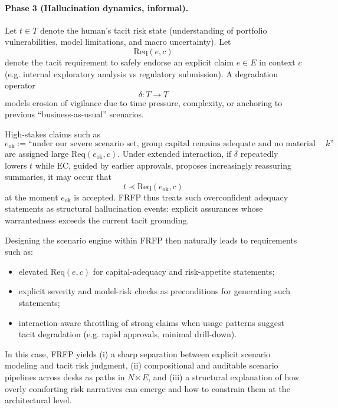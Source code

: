 \paragraph{Phase 3 (Hallucination dynamics, informal).}
Let \(t \in T\) denote the human's tacit risk state (understanding of portfolio vulnerabilities, model limitations, and macro uncertainty). Let
\[
  \mathrm{Req}(e,c)
\]
denote the tacit requirement to safely endorse an explicit claim \(e \in E\) in context \(c\) (e.g. internal exploratory analysis vs regulatory submission). A degradation operator
\[
  \delta: T \to T
\]
models erosion of vigilance due to time pressure, complexity, or anchoring to previous ``business-as-usual'' scenarios.

High-stakes claims such as
\[
  e_{\mathrm{ok}} := \text{``under our severe scenario set, group capital remains adequate and no material vulnerabilities arise in sector \(k\)''}
\]
are assigned large \(\mathrm{Req}(e_{\mathrm{ok}},c)\). Under extended interaction, if \(\delta\) repeatedly lowers \(t\) while \(\mathrm{EC}\), guided by earlier approvals, proposes increasingly reassuring summaries, it may occur that
\[
  t \prec \mathrm{Req}(e_{\mathrm{ok}},c)
\]
at the moment \(e_{\mathrm{ok}}\) is accepted. FRFP thus treats such overconfident adequacy statements as structural hallucination events: explicit assurances whose warrantedness exceeds the current tacit grounding.

Designing the scenario engine within FRFP then naturally leads to requirements such as:
\begin{itemize}
  \item elevated \(\mathrm{Req}(e,c)\) for capital-adequacy and risk-appetite statements;
  \item explicit severity and model-risk checks as preconditions for generating such statements;
  \item interaction-aware throttling of strong claims when usage patterns suggest tacit degradation (e.g. rapid approvals, minimal drill-down).
\end{itemize}

\medskip

\noindent In this case, FRFP yields (i) a sharp separation between explicit scenario modeling and tacit risk judgment, (ii) compositional and auditable scenario pipelines across desks as paths in \(N \ltimes E\), and (iii) a structural explanation of how overly comforting risk narratives can emerge and how to constrain them at the architectural level.
